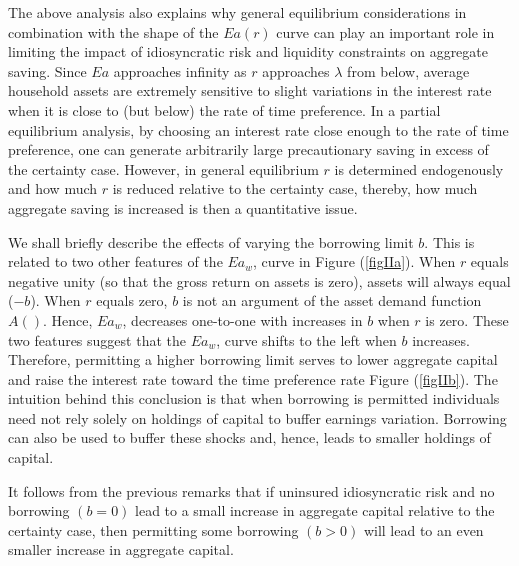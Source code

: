 \documentclass[12pt]{article}
\theoremstyle{definition}
\begin{document}
The above analysis also explains why general equilibrium considerations in combination with the shape of the $Ea(r)$ curve can play an important role in limiting the impact of idiosyncratic risk and liquidity constraints on aggregate saving. Since $Ea$ approaches infinity as $r$ approaches $\lambda$ from below, average household assets are extremely sensitive to slight variations in the interest rate when it is close to (but below) the rate of time preference. In a partial equilibrium analysis, by choosing an interest rate close enough to the rate of time preference, one can generate arbitrarily large precautionary saving in excess of the certainty case. However, in general equilibrium $r$ is determined endogenously and how much $r$ is reduced relative to the certainty case, thereby, how much aggregate saving is increased is then a quantitative issue.

We shall briefly describe the effects of varying the borrowing limit $b$. This is related to two other features of the $Ea_w$, curve in Figure (\ref{figIIa}). When $r$ equals negative unity (so that the gross return on assets is zero), assets will always equal ($-b$). When $r$ equals zero, $b$ is not an argument of the asset demand function $A ( )$. Hence, $Ea_w$, decreases one-to-one with increases in $b$ when $r$ is zero. These two features suggest that the $Ea_w$, curve shifts to the left when $b$ increases. Therefore, permitting a higher borrowing limit serves to lower aggregate capital and raise the interest rate toward the time preference rate Figure (\ref{figIIb}). The intuition behind this conclusion is that when borrowing is permitted individuals need not rely solely on holdings of capital to buffer earnings variation. Borrowing can also be used to buffer these shocks and, hence, leads to smaller holdings of capital.

It follows from the previous remarks that if uninsured idiosyncratic risk and no borrowing $(b = 0)$ lead to a small increase in aggregate capital relative to the certainty case, then permitting some borrowing $(b > 0)$ will lead to an even smaller increase in aggregate capital.
\end{document}
